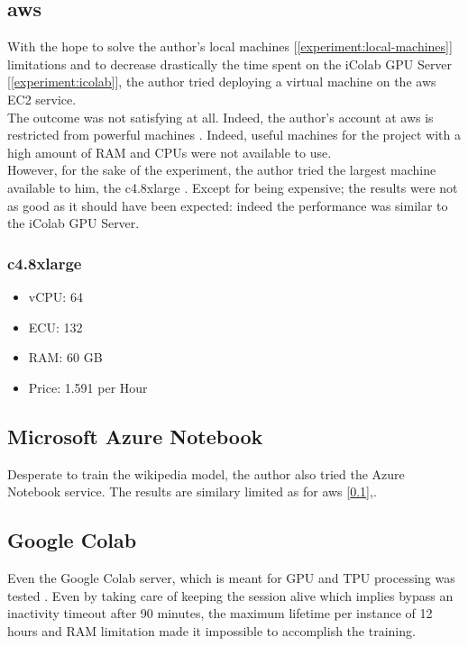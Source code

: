 \subsection{\gls{aws}}
\label{experiment:aws}
With the hope to solve the author's local machines [\ref{experiment:local-machines}] limitations and to decrease drastically the time spent on the iColab GPU Server [\ref{experiment:icolab}], the author tried deploying a virtual machine on the \gls{aws} EC2 service\cite{article:aws-ec2-dl-install}.\\

The outcome was not satisfying at all. Indeed, the author's account at \gls{aws} is restricted from powerful machines \cite{article:aws-ec2-service-limits}. Indeed, useful machines for the project with a high amount of RAM and CPUs were not available to use. \\

However, for the sake of the experiment, the author tried the largest machine available to him, the c4.8xlarge \cite{article:aws-ec2-pricing}. Except for being expensive; the results were not as good as it should have been expected: indeed the performance was similar to the iColab GPU Server.

\subsubsection{c4.8xlarge}
\begin{itemize}
    \setlength\itemsep{0em}
    \item vCPU: 64
    \item ECU: 132
    \item RAM: 60 GB
    \item Price: 1.591 per Hour
\end{itemize}


\subsection{Microsoft Azure Notebook}
\label{experiment:azure-notebook}
Desperate to train the wikipedia model, the author also tried the Azure Notebook service\cite{article:azure-notebook}. The results are similary limited as for \gls{aws} [\ref{experiment:aws}],.


\subsection{Google Colab}
\label{experiment:google-colab}
Even the Google Colab server, which is meant for GPU and TPU processing was tested \cite{article:google-colab}. Even by taking care of keeping the session alive which implies bypass an inactivity timeout after 90 minutes\cite{article:google-colab-timeout}, the maximum lifetime per instance of 12 hours \cite{article:google-colab-faqs} and RAM limitation made it impossible to accomplish the training.


